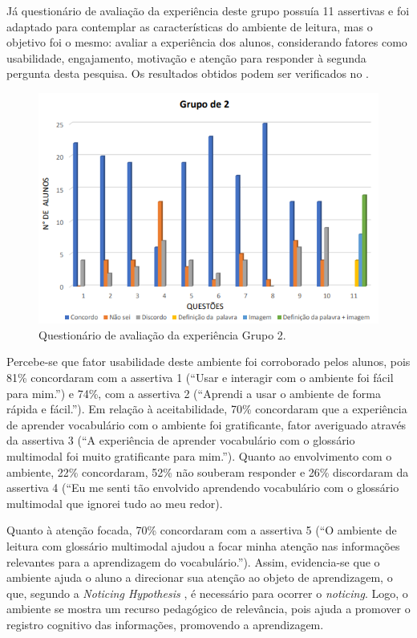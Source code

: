 Já questionário de avaliação da experiência deste grupo possuía 11
assertivas e foi adaptado para contemplar as características do ambiente
de leitura, mas o objetivo foi o mesmo: avaliar a experiência dos
alunos, considerando fatores como usabilidade, engajamento, motivação e
atenção para responder à segunda pergunta desta pesquisa. Os resultados
obtidos podem ser verificados no .

\begin{figure}[htpb]
    \centering
    \begin{minipage}{.75\textwidth}
    \includegraphics[width=\textwidth]{graph-04.png}
    \caption{Questionário de avaliação da experiência Grupo 2.}
    \label{graph-04}
    \end{minipage}
\end{figure}

Percebe-se que fator usabilidade deste ambiente foi corroborado pelos
alunos, pois 81\% concordaram com a assertiva 1 (``Usar e interagir com
o ambiente foi fácil para mim.'') e 74\%, com a assertiva 2 (``Aprendi a
usar o ambiente de forma rápida e fácil.''). Em relação à
aceitabilidade, 70\% concordaram que a experiência de aprender
vocabulário com o ambiente foi gratificante, fator averiguado através da
assertiva 3 (``A experiência de aprender vocabulário com o glossário
multimodal foi muito gratificante para mim.''). Quanto ao envolvimento
com o ambiente, 22\% concordaram, 52\% não souberam responder e 26\%
discordaram da assertiva 4 (``Eu me senti tão envolvido aprendendo
vocabulário com o glossário multimodal que ignorei tudo ao meu redor).

Quanto à atenção focada, 70\% concordaram com a assertiva 5 (``O
ambiente de leitura com glossário multimodal ajudou a focar minha
atenção nas informações relevantes para a aprendizagem do
vocabulário.''). Assim, evidencia-se que o ambiente ajuda o aluno a
direcionar sua atenção ao objeto de aprendizagem, o que, segundo a
\emph{Noticing Hypothesis} \cite{schmidit1990}, é necessário para ocorrer o
\emph{noticing}. Logo, o ambiente se mostra um recurso pedagógico de
relevância, pois ajuda a promover o registro cognitivo das informações,
promovendo a aprendizagem.

